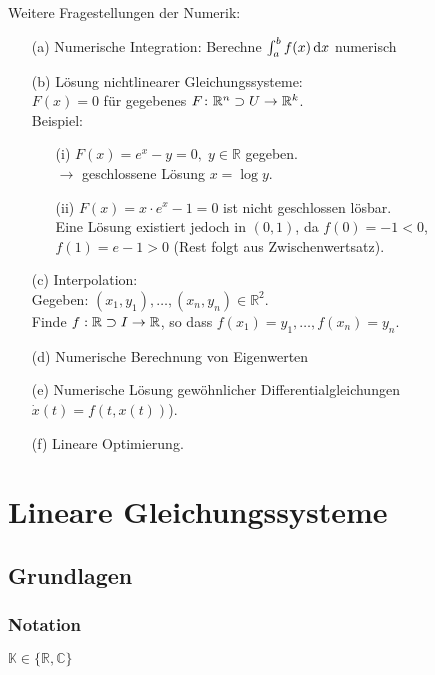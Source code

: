 Weitere Fragestellungen der Numerik:
\begin{enumerate}
\item[(a)]
Numerische Integration: Berechne $\int_a^b f(x) \,\mathrm d x$ numerisch
\item[(b)]
Lösung nichtlinearer Gleichungssysteme: \\
$F(x) = 0$ für gegebenes $F\colon \mathbb R^n \supset U \rightarrow \mathbb{R}^k$. \\
Beispiel:
\begin{enumerate}
\item[(i)]
$F(x)=e^x-y = 0,\; y \in \mathbb{R}$ gegeben. \\
$\rightarrow$ geschlossene Lösung $x = \log y.$
\item[(ii)]
$F(x)=x \cdot e^x -1 = 0$ ist nicht geschlossen lösbar. \\
Eine Lösung existiert jedoch in $(0,1)$, da $f(0) = -1 < 0$, \\
$f(1)= e-1>0 $ (Rest folgt aus Zwischenwertsatz).
\end{enumerate}
\item[(c)]
Interpolation: \\
Gegeben: $(x_1,y_1), \dots, (x_n,y_n) \in \mathbb{R}^2$. \\
Finde $f: \mathbb R \supset I \to \mathbb R$, so dass
$f(x_1) = y_1, \dots , f(x_n)=y_n$.
\item[(d)]
Numerische Berechnung von Eigenwerten
\item[(e)]
Numerische Lösung gewöhnlicher Differentialgleichungen $\dot x(t)=f(t,x(t))$).
\item[(f)]
Lineare Optimierung.
\end{enumerate}

\newpage
\section{Lineare Gleichungssysteme}

\subsection{Grundlagen}

\subsubsection{Notation}

$\mathbb{K} \in \{\mathbb{R}, \mathbb{C}\}$ \\

